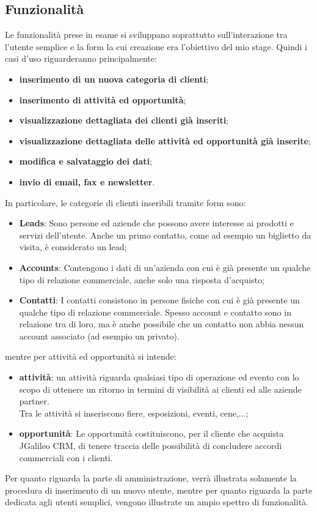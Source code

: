 \subsection{Funzionalità}
Le funzionalità prese in esame si sviluppano soprattutto sull'interazione tra l'utente semplice e la form la cui creazione era l'obiettivo del mio stage.
Quindi i casi d'uso riguarderanno principalmente:
\begin{itemize}
	\item \textbf{inserimento di un nuova categoria di clienti};
	\item \textbf{inserimento di attività ed opportunità};
	\item \textbf{visualizzazione dettagliata dei clienti già inseriti};
	\item \textbf{visualizzazione dettagliata delle attività ed opportunità già inserite};
	\item \textbf{modifica e salvataggio dei dati};
	\item \textbf{invio di email, fax e newsletter}.
\end{itemize}
In particolare, le categorie di clienti inseribili tramite form sono:
\begin{itemize}
	\item \textbf{Leads}: Sono persone ed aziende che possono avere interesse ai prodotti e servizi dell'utente. Anche un primo contatto, come ad esempio un biglietto da visita, è considerato un lead;
	\item \textbf{Accounts}: Contengono i dati di un'azienda con cui è già presente un qualche tipo di relazione commerciale, anche solo una risposta d'acquisto;
	\item \textbf{Contatti}: I contatti consistono in persone fisiche con cui è già presente un qualche tipo di relazione commerciale. Spesso account e contatto sono in relazione tra di loro, ma è anche possibile che un contatto non abbia nessun account associato (ad esempio un privato).
\end{itemize}
mentre per attività ed opportunità si intende:
\begin{itemize}
	\item \textbf{attività}: un attività riguarda qualsiasi tipo di operazione ed evento con lo scopo di ottenere un ritorno in termini di visibilità ai clienti ed alle aziende partner.\\
	Tra le attività si inseriscono fiere, esposizioni, eventi, cene,...;
	\item \textbf{opportunità}: Le opportunità costituiscono, per il cliente che acquista JGalileo CRM, di tenere traccia delle possibilità di concludere accordi commerciali con i clienti.
\end{itemize}
Per quanto riguarda la parte di amministrazione, verrà illustrata solamente la procedura di inserimento di un nuovo utente, mentre per quanto riguarda la parte dedicata agli utenti semplici, vengono illustrate un ampio spettro di funzionalità.

